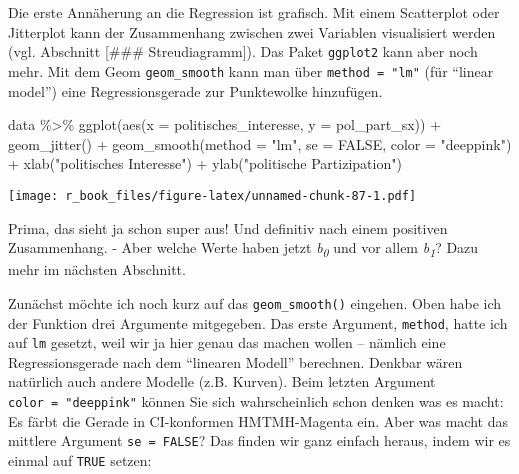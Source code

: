 \documentclass[
]{book}
\newenvironment{Shaded}{\begin{snugshade}}{\end{snugshade}}
\newcommand{\AttributeTok}[1]{\textcolor[rgb]{0.77,0.63,0.00}{#1}}
\newcommand{\ConstantTok}[1]{\textcolor[rgb]{0.00,0.00,0.00}{#1}}
\newcommand{\FunctionTok}[1]{\textcolor[rgb]{0.00,0.00,0.00}{#1}}
\newcommand{\NormalTok}[1]{#1}
\newcommand{\SpecialCharTok}[1]{\textcolor[rgb]{0.00,0.00,0.00}{#1}}
\newcommand{\StringTok}[1]{\textcolor[rgb]{0.31,0.60,0.02}{#1}}
\begin{document}
Die erste Annäherung an die Regression ist grafisch. Mit einem Scatterplot oder Jitterplot kann der Zusammenhang zwischen zwei Variablen visualisiert werden (vgl. Abschnitt {[}\#\#\# Streudiagramm{]}). Das Paket \texttt{ggplot2} kann aber noch mehr. Mit dem Geom \texttt{geom\_smooth} kann man über \texttt{method\ =\ "lm"} (für ``linear model'') eine Regressionsgerade zur Punktewolke hinzufügen.

\begin{Shaded}
\begin{Highlighting}[]
\NormalTok{data }\SpecialCharTok{\%\textgreater{}\%} 
  \FunctionTok{ggplot}\NormalTok{(}\FunctionTok{aes}\NormalTok{(}\AttributeTok{x =}\NormalTok{ politisches\_interesse, }\AttributeTok{y =}\NormalTok{ pol\_part\_sx)) }\SpecialCharTok{+}
  \FunctionTok{geom\_jitter}\NormalTok{() }\SpecialCharTok{+}
  \FunctionTok{geom\_smooth}\NormalTok{(}\AttributeTok{method =} \StringTok{"lm"}\NormalTok{, }\AttributeTok{se =} \ConstantTok{FALSE}\NormalTok{, }\AttributeTok{color =} \StringTok{"deeppink"}\NormalTok{) }\SpecialCharTok{+}
  \FunctionTok{xlab}\NormalTok{(}\StringTok{"politisches Interesse"}\NormalTok{) }\SpecialCharTok{+}
  \FunctionTok{ylab}\NormalTok{(}\StringTok{"politische Partizipation"}\NormalTok{)}
\end{Highlighting}
\end{Shaded}

\texttt{[image: r\_book\_files/figure-latex/unnamed-chunk-87-1.pdf]}

Prima, das sieht ja schon super aus! Und definitiv nach einem positiven Zusammenhang. - Aber welche Werte haben jetzt \emph{b\textsubscript{0}} und vor allem \emph{b\textsubscript{1}}? Dazu mehr im nächsten Abschnitt.

Zunächst möchte ich noch kurz auf das \texttt{geom\_smooth()} eingehen. Oben habe ich der Funktion drei Argumente mitgegeben. Das erste Argument, \texttt{method}, hatte ich auf \texttt{lm} gesetzt, weil wir ja hier genau das machen wollen -- nämlich eine Regressionsgerade nach dem ``linearen Modell'' berechnen. Denkbar wären natürlich auch andere Modelle (z.B. Kurven). Beim letzten Argument \texttt{color\ =\ "deeppink"} können Sie sich wahrscheinlich schon denken was es macht: Es färbt die Gerade in CI-konformen HMTMH-Magenta ein. Aber was macht das mittlere Argument \texttt{se\ =\ FALSE}? Das finden wir ganz einfach heraus, indem wir es einmal auf \texttt{TRUE} setzen:
\end{document}
